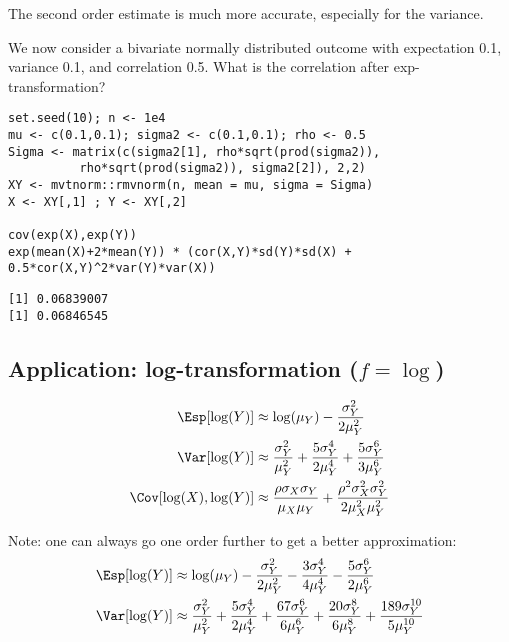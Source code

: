 \documentclass[12pt]{article}
\begin{document}
The second order estimate is much more accurate, especially for the
variance.

\bigskip

We now consider a bivariate normally distributed outcome with
expectation 0.1, variance 0.1, and correlation 0.5. What is the
correlation after exp-transformation?
\lstset{language=r,label= ,caption= ,captionpos=b,numbers=none}
\begin{lstlisting}
set.seed(10); n <- 1e4
mu <- c(0.1,0.1); sigma2 <- c(0.1,0.1); rho <- 0.5
Sigma <- matrix(c(sigma2[1], rho*sqrt(prod(sigma2)),
		  rho*sqrt(prod(sigma2)), sigma2[2]), 2,2)
XY <- mvtnorm::rmvnorm(n, mean = mu, sigma = Sigma)
X <- XY[,1] ; Y <- XY[,2]

cov(exp(X),exp(Y))
exp(mean(X)+2*mean(Y)) * (cor(X,Y)*sd(Y)*sd(X) + 0.5*cor(X,Y)^2*var(Y)*var(X))
\end{lstlisting}

\begin{verbatim}
[1] 0.06839007
[1] 0.06846545
\end{verbatim}


\clearpage

\subsection{Application:  log-transformation (\(f = \log\))}
\label{sec:orgcd3ff0e}

\begin{align*}
\Esp[\log(Y)] &\approx \log(\mu_Y) - \frac{\sigma_Y^2}{2\mu_Y^2} \\
\Var[\log(Y)] &\approx \frac{\sigma^2_Y}{\mu_Y^2} + \frac{5 \sigma^4_Y}{2\mu_Y^4} + \frac{5 \sigma^6_Y}{3\mu_Y^6} \\
\Cov[\log(X),\log(Y)] &\approx \frac{\rho \sigma_X \sigma_Y}{\mu_X\mu_Y} + \frac{\rho^2 \sigma^2_X \sigma^2_Y}{2\mu_X^2\mu_Y^2}
\end{align*}

Note: one can always go one order further to get a better approximation:
\begin{align*}
\Esp[\log(Y)] &\approx \log(\mu_Y) - \frac{\sigma_Y^2}{2\mu_Y^2} - \frac{3\sigma_Y^4}{4\mu_Y^4}  - \frac{5\sigma_Y^6}{2\mu_Y^6}  \\
\Var[\log(Y)] &\approx \frac{\sigma^2_Y}{\mu_Y^2} + \frac{5 \sigma^4_Y}{2\mu_Y^4} + \frac{67 \sigma^6_Y}{6\mu_Y^6} + \frac{20\sigma^8_Y}{6\mu_Y^8} + \frac{189\sigma^{10}_Y}{5\mu_Y^{10}} \\
\end{align*}
\end{document}
